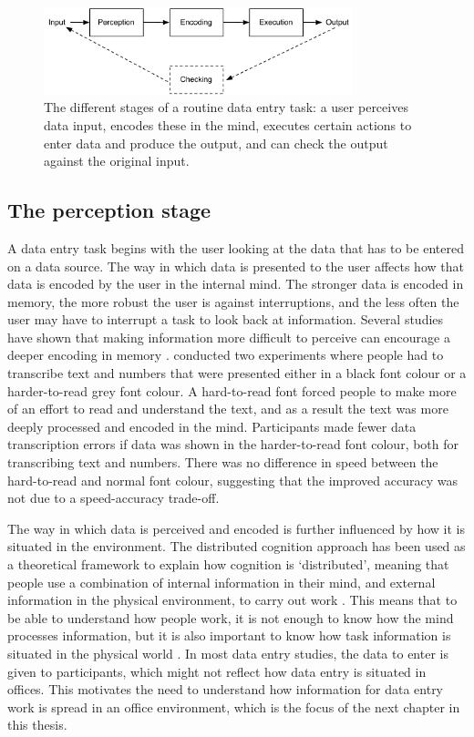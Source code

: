 \begin{figure}[!ht]
\centering
\includegraphics[width=0.8\textwidth]{images/background/HIP.pdf}
\caption[Different stages of a data entry task]{The different stages of a routine data entry task: a user perceives data input, encodes these in the mind, executes certain actions to enter data and produce the output, and can check the output against the original input.}
\vspace{-3pt}
\label{fig:ch2_hip}
\end{figure}


\subsection{The perception stage}
A data entry task begins with the user looking at the data that has to be entered on a data source.  The way in which data is presented to the user affects how that data is encoded by the user in the internal mind. The stronger data is encoded in memory, the more robust the user is against interruptions, and the less often the user may have to interrupt a task to look back at information. Several studies have shown that making information more difficult to perceive can encourage a deeper encoding in memory \citep{Diemand-Yauman2011, Soboczenski2013}. \citet{Soboczenski2013} conducted two experiments where people had to transcribe text and numbers that were presented either in a black font colour or a harder-to-read grey font colour. A hard-to-read font forced people to make more of an effort to read and understand the text, and as a result the text was more deeply processed and encoded in the mind. Participants made fewer data transcription errors if data was shown in the harder-to-read font colour, both for transcribing text and numbers. There was no difference in speed between the hard-to-read and normal font colour, suggesting that the improved accuracy was not due to a speed-accuracy trade-off. 

The way in which data is perceived and encoded is further influenced by how it is situated in the environment. The distributed cognition approach has been used as a theoretical framework to explain how cognition is ‘distributed’, meaning that people use a combination of internal information in their mind, and external information in the physical environment, to carry out work \citep{Hollan2000, Hutchins1995}. This means that to be able to understand how people work, it is not enough to know how the mind processes information, but it is also important to know how task information is situated in the physical world \citep{Hollan2000}. In most data entry studies, the data to enter is given to participants, which might not reflect how data entry is situated in offices. This motivates the need to understand how information for data entry work is spread in an office environment, which is the focus of the next chapter in this thesis. 

